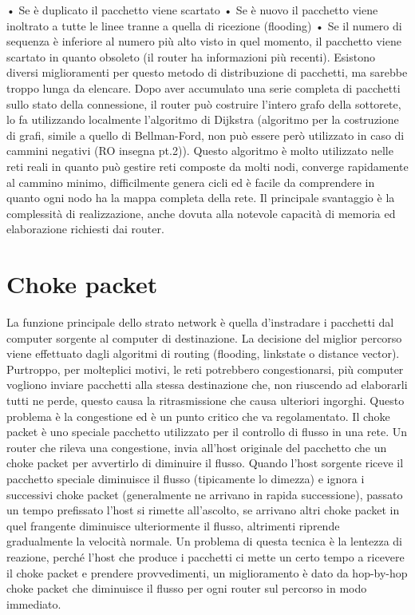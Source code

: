 •	Se è duplicato il pacchetto viene scartato
•	Se è nuovo il pacchetto viene inoltrato a tutte le linee tranne a quella di ricezione (flooding)
•	Se il numero di sequenza è inferiore al numero più alto visto in quel momento, il pacchetto viene scartato in quanto obsoleto (il router ha informazioni più recenti).
Esistono diversi miglioramenti per questo metodo di distribuzione di pacchetti, ma sarebbe troppo lunga da elencare.
Dopo aver accumulato una serie completa di pacchetti sullo stato della connessione, il router può costruire l’intero grafo della sottorete, lo fa utilizzando localmente l’algoritmo di Dijkstra (algoritmo per la costruzione di grafi, simile a quello di Bellman-Ford, non può essere però utilizzato in caso di cammini negativi (RO insegna pt.2)).
Questo algoritmo è molto utilizzato nelle reti reali in quanto può gestire reti composte da molti nodi, converge rapidamente al cammino minimo, difficilmente genera cicli ed è facile da comprendere in quanto ogni nodo ha la mappa completa della rete. Il principale svantaggio è la complessità di realizzazione, anche dovuta alla notevole capacità di memoria ed elaborazione richiesti dai router.
\section{Choke packet}

La funzione principale dello strato network è quella d’instradare i pacchetti dal computer sorgente al computer di destinazione. La decisione del miglior percorso viene effettuato dagli algoritmi di routing (flooding, linkstate o distance vector). Purtroppo, per molteplici motivi, le reti potrebbero congestionarsi, più computer vogliono inviare pacchetti alla stessa destinazione che, non riuscendo ad elaborarli tutti ne perde, questo causa la ritrasmissione che causa ulteriori ingorghi. Questo problema è la congestione ed è un punto critico che va regolamentato.
Il choke packet è uno speciale pacchetto utilizzato per il controllo di flusso in una rete. Un router che rileva una congestione, invia all’host originale del pacchetto che un choke packet per avvertirlo di diminuire il flusso. Quando l’host sorgente riceve il pacchetto speciale diminuisce il flusso (tipicamente lo dimezza) e ignora i successivi choke packet (generalmente ne arrivano in rapida successione), passato un tempo prefissato l’host si rimette all’ascolto, se arrivano altri choke packet in quel frangente diminuisce ulteriormente il flusso, altrimenti riprende gradualmente la velocità normale.
Un problema di questa tecnica è la lentezza di reazione, perché l’host che produce i pacchetti ci mette un certo tempo a ricevere il choke packet e prendere provvedimenti, un miglioramento è dato da hop-by-hop choke packet che diminuisce il flusso per ogni router sul percorso in modo immediato.
 
